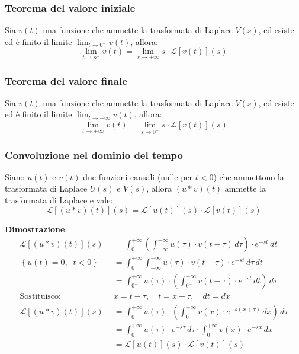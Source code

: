 \documentclass[a4paper]{article}
\begin{document}
\subsubsection{Teorema del valore iniziale}
Sia \( v(t) \) una funzione che ammette la trasformata di Laplace \( V(s) \), ed esiste
ed è finito il limite \( \lim_{t \to 0^-} v(t) \), allora:
\[
  \lim_{t \to o^-} v(t) = \lim_{s \to +\infty} s \cdot \mathcal{L}[v(t)](s)
\] 

\subsubsection{Teorema del valore finale}
Sia \( v(t) \) una funzione che ammette la trasformata di Laplace \( V(s) \), ed esiste
ed è finito il limite \( \lim_{t \to +\infty} v(t) \), allora:
\[
  \lim_{t \to +\infty} v(t) = \lim_{s \to 0^+} s \cdot \mathcal{L}[v(t)](s)
\]

\subsubsection{Convoluzione nel dominio del tempo}
Siano \( u(t) \) e \( v(t) \) due funzioni causali (nulle per \( t < 0 \)) che ammettono
la trasformata di Laplace \( U(s) \) e \( V(s) \), allora \( (u \ast v)(t) \) ammette
la trasformata di Laplace e vale:
\[
  \mathcal{L}[(u \ast v)(t)](s) = \mathcal{L}[u(t)](s) \cdot \mathcal{L}[v(t)](s)
\] 

\vspace{1em}
\noindent
\textbf{Dimostrazione}:
\[
  \begin{aligned}
    \mathcal{L}[(u \ast v)(t)](s) &= \int_{0^-}^{+\infty} \left( 
    \int_{-\infty}^{+\infty} u(\tau) \cdot v(t-\tau) \, d\tau \right) \cdot e^{-st} \, dt\\
    \left\{ u(t) = 0, \;\; t < 0 \right\} \quad &= \int_{0^-}^{+\infty} \int_{-\infty}^{+\infty} u(\tau) \cdot v(t-\tau) \cdot e^{-st} \, d\tau \, dt\\
                               &= \int_{0^-}^{+\infty} u(\tau) \cdot \left( 
                                 \int_{0^-}^{+\infty} v(t-\tau) \cdot e^{-st} \, dt \right) \, d\tau\\
    \text{Sostituisco: } & x = t-\tau, \quad t = x + \tau, \quad dt = dx\\
    \mathcal{L}[(u \ast v)(t)](s) &= \int_{0^-}^{+\infty} u(\tau) \cdot \left(
      \int_{0^-}^{+\infty} v(x) \cdot e^{-s(x+\tau)} \, dx \right) \, d\tau\\
                                  &= \int_{0^-}^{+\infty} u(\tau) \cdot e^{-s \tau} \, d\tau \cdot
                                  \int_{0^-}^{+\infty} v(x) \cdot e^{-sx} \, dx\\
                                  &= \mathcal{L}[u(t)](s) \cdot \mathcal{L}[v(t)](s)
  \end{aligned}
\]
\end{document}
